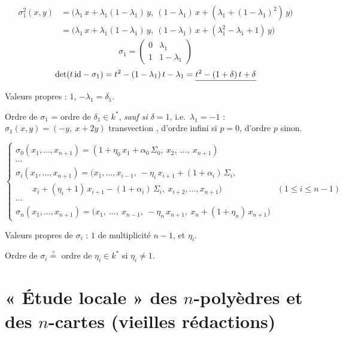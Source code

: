 \documentclass[11pt,a4paper]{article}
\begin{document}
\[
\begin{aligned}
\sigma_1^2(x,y) &= \bigl(\lambda_1\,x + \lambda_1(1-\lambda_1)\,y,\ (1-\lambda_1)\,x + (\lambda_1 + (1-\lambda_1)^2)\,y\bigr)\\
&= \bigl(\lambda_1\,x + \lambda_1(1-\lambda_1)\,y,\ (1-\lambda_1)\,x + (\lambda_1^2 - \lambda_1 + 1)\,y\bigr)
\end{aligned}
\]
\[
\sigma_1 = \begin{pmatrix}0 & \lambda_1\\ 1 & 1-\lambda_1\end{pmatrix}
\]
\[
\det(t\,\mathrm{id} - \sigma_1) = t^2 - (1-\lambda_1)\,t - \lambda_1 = \struck{t^2 - (1+\delta)\,t + \delta}
\]
Valeurs propres  : $1$, $-\lambda_1 = \delta_1$.


Ordre de $\sigma_1$ = ordre de $\delta_1 \in k^*$, \emph{sauf si $\delta = 1$}, i.e.\ $\lambda_1 = -1$ :
$\sigma_1(x,y) = (-y,\ x + 2y)$ transvection \struck{\ill{}} , d'ordre infini si $p = 0$, d'ordre $p$ sinon.

\[
\begin{cases}
\sigma_0(x_1,\dots,x_{n+1}) = (1 + \eta_0\,x_1 + \alpha_0\,\Sigma_0,\ x_2,\ \dots,\ x_{n+1})\\
\cdots\\
\sigma_i(x_1,\dots,x_{n+1}) = \bigl(x_1,\dots,x_{i-1},\ -\eta_i\,x_{i+1} + (1+\alpha_i)\,\Sigma_i, & \\
\qquad x_i + (\eta_i + 1)\,x_{i+1} - (1+\alpha_i)\,\Sigma_i,\ x_{i+2},\dots,x_{n+1}\bigr) & (1\le i\le n-1)\\
\cdots\\
\sigma_n(x_1,\dots,x_{n+1}) = \bigl(x_1,\ \dots,\ x_{n-1},\ -\eta_n\,x_{n+1},\ x_n + (1+\eta_n)\,x_{n+1}\bigr)
\end{cases}
\]

Valeurs propres de $\sigma_i$ : $1$ de multiplicité $n-1$, et $\eta_i$.

Ordre de $\sigma_i \overset{?}{=}$ ordre de $\eta_i \in k^*$ si $\eta_i \ne 1$.

\section{« Étude locale » des $n$-polyèdres et des $n$-cartes (vieilles rédactions)}
\end{document}

